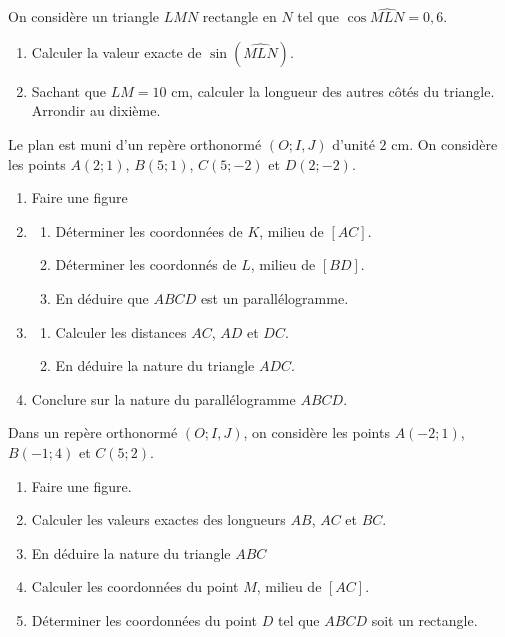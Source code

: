 \documentclass[11pt]{article}
\begin{document}
\begin{exo}
On considère un triangle $LMN$ rectangle en $N$ tel que
$\cos\widehat{MLN}=0,6$.
\begin{enumerate}
  \item Calculer la valeur exacte de $\sin(\widehat{MLN})$.
  \item Sachant que $LM=10$ cm, calculer la longueur des autres côtés du
    triangle. Arrondir au dixième.
\end{enumerate}
\end{exo}


\begin{exo}
Le plan est muni d'un repère orthonormé $(O; I, J)$
d'unité $2$ cm. On considère les points $A(2; 1)$, $B(5; 1)$, $C(5; -2)$ et
$D(2; -2)$.
\begin{enumerate}
  \item Faire une figure
  \item \begin{enumerate}
      \item Déterminer les coordonnées de $K$, milieu de $\left[ AC
        \right]$.
      \item Déterminer les coordonnés de $L$, milieu de $\left[ BD \right]$.
      \item En déduire que $ABCD$ est un parallélogramme.
    \end{enumerate}
  \item \begin{enumerate}
      \item Calculer les distances $AC$, $AD$ et $DC$.
      \item En déduire la nature du triangle $ADC$.
    \end{enumerate}
  \item Conclure sur la nature du parallélogramme $ABCD$.
\end{enumerate}
\end{exo}

\begin{exo}
Dans un repère orthonormé $(O; I, J)$, on considère les
points $A(-2;1)$, $B(-1; 4)$ et $C(5;2)$.
\begin{enumerate}
  \item Faire une figure.
  \item Calculer les valeurs exactes des longueurs $AB$, $AC$ et $BC$.
  \item En déduire la nature du triangle $ABC$
  \item Calculer les coordonnées du point $M$, milieu de $\left[ AC
    \right]$.
  \item Déterminer les coordonnées du point $D$ tel que $ABCD$ soit un
    rectangle.
\end{enumerate}
\end{exo}
\end{document}

